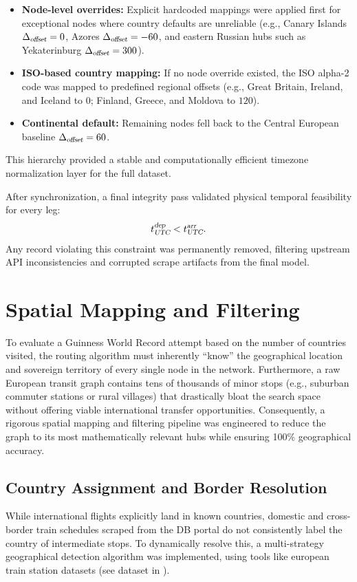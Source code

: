 \begin{itemize}
  \item \textbf{Node-level overrides:} Explicit hardcoded mappings were applied first for exceptional nodes where country defaults are unreliable (e.g., Canary Islands $\Delta_{\textsl{offset}}=0$, Azores $\Delta_{\textsl{offset}}=-60$, and eastern Russian hubs such as Yekaterinburg $\Delta_{\textsl{offset}}=300$).
  \item \textbf{ISO-based country mapping:} If no node override existed, the ISO alpha-2 code was mapped to predefined regional offsets (e.g., Great Britain, Ireland, and Iceland to $0$; Finland, Greece, and Moldova to $120$).
  \item \textbf{Continental default:} Remaining nodes fell back to the Central European baseline $\Delta_{\textsl{offset}}=60$.
\end{itemize}
This hierarchy provided a stable and computationally efficient timezone normalization layer for the full dataset.

\medskip

After synchronization, a final integrity pass validated physical temporal feasibility for every leg:
\[
t_{\textsl{UTC}}^{\textsl{dep}} < t_{\textsl{UTC}}^{\textsl{arr}}.
\]
Any record violating this constraint was permanently removed, filtering upstream API inconsistencies and corrupted scrape artifacts from the final model.

\section{Spatial Mapping and Filtering}
\label{sec:spatial_mapping}
To evaluate a Guinness World Record attempt based on the number of countries visited, the routing algorithm must inherently ``know'' the geographical location and sovereign territory of every single node in the network. Furthermore, a raw European transit graph contains tens of thousands of minor stops (e.g., suburban commuter stations or rural villages) that drastically bloat the search space without offering viable international transfer opportunities. Consequently, a rigorous spatial mapping and filtering pipeline was engineered to reduce the graph to its most mathematically relevant hubs while ensuring 100\% geographical accuracy.

\subsection{Country Assignment and Border Resolution}
\label{subsec:country_assignment_border_resolution}
While international flights explicitly land in known countries, domestic and cross-border train schedules scraped from the DB portal do not consistently label the country of intermediate stops. To dynamically resolve this, a multi-strategy geographical detection algorithm was implemented, using tools like european train station datasets (see dataset in \cite{kaggle_train_stations}).


